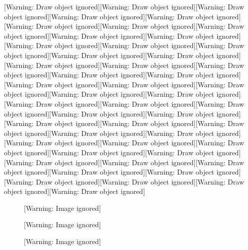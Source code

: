 

[Warning: Draw object ignored][Warning: Draw object ignored][Warning: Draw object ignored][Warning: Draw object ignored][Warning: Draw object ignored][Warning: Draw object ignored][Warning: Draw object ignored][Warning: Draw object ignored][Warning: Draw object ignored][Warning: Draw object ignored][Warning: Draw object ignored][Warning: Draw object ignored][Warning: Draw object ignored][Warning: Draw object ignored][Warning: Draw object ignored][Warning: Draw object ignored][Warning: Draw object ignored][Warning: Draw object ignored][Warning: Draw object ignored][Warning: Draw object ignored][Warning: Draw object ignored][Warning: Draw object ignored][Warning: Draw object ignored][Warning: Draw object ignored][Warning: Draw object ignored][Warning: Draw object ignored][Warning: Draw object ignored][Warning: Draw object ignored][Warning: Draw object ignored][Warning: Draw object ignored][Warning: Draw object ignored][Warning: Draw object ignored][Warning: Draw object ignored][Warning: Draw object ignored][Warning: Draw object ignored][Warning: Draw object ignored][Warning: Draw object ignored][Warning: Draw object ignored][Warning: Draw object ignored][Warning: Draw object ignored][Warning: Draw object ignored][Warning: Draw object ignored][Warning: Draw object ignored][Warning: Draw object ignored][Warning: Draw object ignored][Warning: Draw object ignored][Warning: Draw object ignored][Warning: Draw object ignored][Warning: Draw object ignored]

\begin{figure}[h]

 [Warning: Image ignored] %

\end{figure}

\begin{figure}[h]

 [Warning: Image ignored] %

\end{figure}

\begin{figure}[h]

 [Warning: Image ignored] %

\end{figure}


